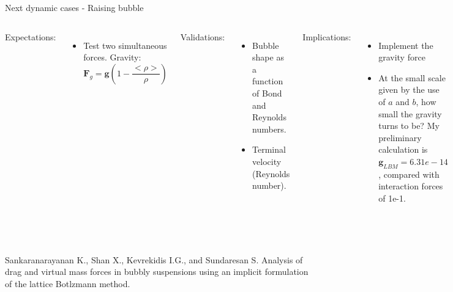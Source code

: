 \documentclass[8pt]{beamer}
\begin{document}
	\begin{frame}{Next dynamic cases - Raising bubble}
				
		\begin{columns}
			
			Expectations:
			\begin{itemize}
				\item Test two simultaneous forces. Gravity:
				\begin{equation*}
					\mathbf{F}_g = \mathbf{g} (1- \frac{<\rho>}{\rho})
				\end{equation*}
			\end{itemize}
			
			Validations:
			\begin{itemize}
				\item Bubble shape as a function of Bond and Reynolds numbers.
				\item Terminal velocity (Reynolds number).
			\end{itemize}
			Implications:
			\begin{itemize}
				\item Implement the gravity force
				\item At the small scale given by the use of $a$ and $b$, how small the gravity turns to be? My preliminary calculation is $\mathbf{g}_{LBM} = 6.31 e-14$, compared with interaction forces of 1e-1.
			\end{itemize}
		\end{columns}
		~\\~\\
		{\tiny Sankaranarayanan K., Shan X., Kevrekidis I.G., and Sundaresan S. Analysis of drag and virtual mass forces in bubbly suspensions using an implicit formulation of the lattice Botlzmann method.}
	\end{frame}
	
\end{document}
